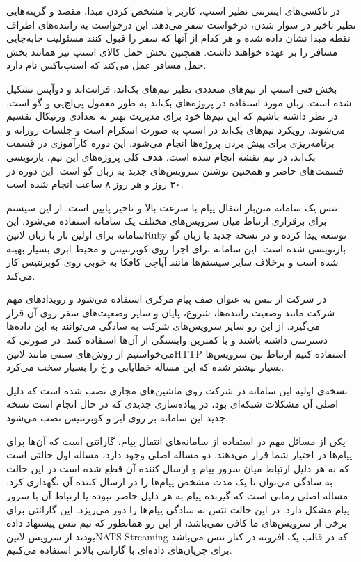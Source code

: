 \documentclass[a4]{report}
\begin{document}
در تاکسی‌های اینترنتی نظیر اسنپ، کاربر با مشخص کردن مبدا، مقصد و گزینه‌هایی نظیر تاخیر در سوار
شدن، درخواست سفر می‌دهد. این درخواست به راننده‌های اطراف نقطه مبدا نشان داده شده و هر کدام از آنها
که سفر را قبول کنند مسئولیت جابه‌جایی مسافر را بر عهده خواهند داشت. همچنین بخش حمل کالای اسنپ
نیز همانند بخش حمل مسافر عمل می‌کند که اسنپ‌باکس نام دارد.

بخش فنی اسنپ از تیم‌های متعددی نظیر تیم‌های بک‌اند، فرانت‌اند و دوآپس
تشکیل شده است. زبان مورد استفاده در پروژه‌های بک‌اند به طور معمول پی‌اچ‌پی و گو است.
در نظر داشته باشیم که این تیم‌ها خود برای مدیریت بهتر به تعدادی ورتیکال تقسیم می‌شوند.
رویکرد تیم‌های بک‌اند در اسنپ به صورت اسکرام است و جلسات روزانه و برنامه‌ریزی برای پیش بردن پروژه‌ها انجام می‌شود.
این دوره کارآموزی در قسمت بک‌اند، در تیم نقشه انجام شده است. هدف کلی پروژه‌های این تیم، بازنویسی
قسمت‌های حاضر و همچنین نوشتن سرویس‌های جدید به زبان گو است. این دوره در ۳۰ روز و هر روز ۸ ساعت انجام شده است.

نتس یک سامانه متن‌باز انتقال پیام با سرعت بالا و تاخیر پایین است. از این سیستم برای برقراری ارتباط میان سرویس‌های مختلف یک سامانه استفاده می‌شود.
این سامانه برای اولین بار با زبان ‌لاتین{Ruby} توسعه پیدا کرده و در نسخه جدید با زبان گو بازنویسی شده است. این سامانه برای اجرا روی کوبرنتیس و محیط ابری بسیار بهینه شده است
و برخلاف سایر سیستم‌ها مانند آپاچی کافکا به خوبی روی کوبرنتیس کار می‌کند.

در شرکت از نتس به عنوان صف پیام مرکزی استفاده می‌شود و رویدادهای مهم شرکت مانند وضعیت راننده‌ها، شروع، پایان و سایر وضعیت‌های سفر روی آن قرار می‌گیرد.
از این رو سایر سرویس‌های شرکت به سادگی می‌توانند به این داده‌ها دسترسی داشته باشند و با کمترین وابستگی از آن‌ها استفاده ‌کنند. در صورتی که می‌خواستیم از روش‌های سنتی مانند ‌لاتین{HTTP}
استفاده کنیم ارتباط بین سرویس‌ها بسیار بیشتر شده که این مساله خطایابی و ‌خ را بسیار سخت می‌کرد.

نسخه‌ی اولیه این سامانه در شرکت روی ماشین‌های مجازی نصب شده است که دلیل اصلی آن مشکلات شبکه‌ای بود، در پیاده‌سازی جدیدی که در حال انجام است نسخه جدید این سامانه بر روی ابر و کوبرنتیس نصب می‌شود.

یکی از مسائل مهم در استفاده از سامانه‌های انتقال پیام، گارانتی است که آن‌ها برای پیام‌ها در اختیار شما قرار می‌دهند. دو مساله اصلی وجود دارد، مساله اول حالتی است که به هر دلیل ارتباط میان سرور پیام و ارسال کننده آن قطع شده است
در این حالت به سادگی می‌توان تا یک مدت مشخص پیام‌ها را در ارسال کننده آن نگهداری کرد. مساله اصلی زمانی است که گیرنده پیام به هر دلیل حاضر نبوده یا ارتباط آن با سرور پیام مشکل دارد. در این حالت نتس به سادگی پیام‌ها را دور می‌ریزد.
این گارانتی برای برخی از سرویس‌های ما کافی نمی‌باشد، از این رو همانطور که تیم نتس پیشنهاد داده بودند از سرویس ‌لاتین{NATS Streaming} که در قالب یک افزونه در کنار نتس می‌باشد برای جریان‌های داده‌ای با گارانتی بالاتر استفاده می‌کنیم.
\end{document}
